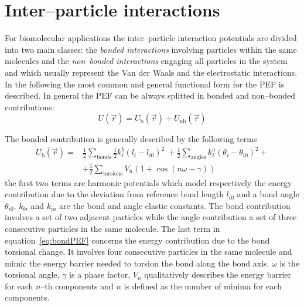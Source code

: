 \section{Inter--particle interactions}
For biomolecular applications the inter--particle interaction potentials are divided into two main classes: the
\textit{bonded interactions} involving particles within the same molecules and the \textit{non--bonded
interactions} engaging all particles in the system and which usually represent the Van der Waals and the
electrostatic interactions. In the following the most common and general functional form for the \ac{PEF} is
described. In general the \ac{PEF} can be always splitted in bonded and non--bonded contributions:
\begin{equation*}
	U(\vec r) = U_{\text{b}}(\vec r) + U_\text{nb}(\vec r)
	\label{eq:FFPEF}
\end{equation*}

The bonded contribution is generally described by the following terms
\begin{equation}
	\begin{aligned}
	U_{\text{b}}(\vec r) = &\frac{1}{2}\sum_{\text{bonds}} \frac{1}{2}k_i^b(l_i - l_{i0})^2\ + \frac{1}{2}\sum_{\text{angles}} k_i^a (\theta_i - \theta_{i0})^2 +\\
		 	& +\frac{1}{2}\sum_{\text{torsions}} V_n(1+\cos (n\omega - \gamma))
	\end{aligned}
	\label{eq:bondPEF}
\end{equation}
the first two terms are harmonic potentials which model respectively the energy contribution due to the deviation
from reference bond length $l_{i0}$ and a bond angle $\theta_{i0}$. $k_{bi}$ and $k_{ia}$ are the bond and angle
elastic constants. The bond contribution involves a set of two adjacent particles while the angle contribution a set 
of three consecutive particles in the same molecule. The last term in equation~\eqref{eq:bondPEF} concerns the 
energy contribution due to the bond torsional change. It involves four consecutive particles in the same molecule 
and mimic the energy barrier needed to torsion the bond along the bond axis. $\omega$ is the torsional angle,
$\gamma$ is a phase factor, $V_n$ qualitatively describes the energy barrier for each $n$--th components and $n$ is 
defined as the number of minima for each components.

